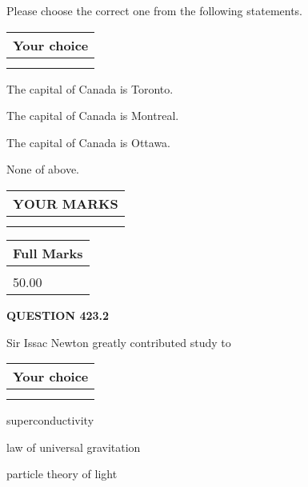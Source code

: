 \documentclass[12pt]{article}
\begin{document}
  
Please choose the correct one from the following statements.
  
  
\noindent\hspace{3.0in} \begin{tabular}{|l|}
\hline
Your choice \\
\hline
 \\ 
 \\ 
\hline
\end{tabular}
  
  
 
 
The capital of Canada is Toronto.
 
 
The capital of Canada is Montreal.
 
 
The capital of Canada is Ottawa.
 
 
 None of above.
 
 
  
\vspace{0.2in}
  
\noindent\begin{tabular}{|l|}
\hline
 YOUR MARKS  \\
\hline
 \\ 
 \\ 
\hline
\end{tabular}
\hspace{0.05in} \begin{tabular}{|l|}
\hline
 Full Marks  \\
\hline
 \\ 
50.00 \\
\hline
\end{tabular}
{\textbf{\Large{QUESTION
423.2 
}}}
  
  
Sir Issac Newton greatly contributed study to
  
  
\noindent\hspace{3.0in} \begin{tabular}{|l|}
\hline
Your choice \\
\hline
 \\ 
 \\ 
\hline
\end{tabular}
  
  
 
 
superconductivity
 
 
law of universal gravitation
 
 
particle theory of light
 
\end{document}
